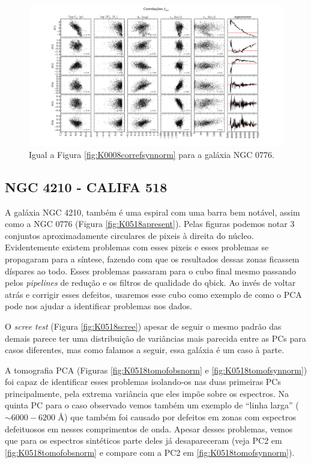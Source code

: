 \begin{figure}
    \includegraphics[width=1.2\textwidth, angle=-90]{figuras/K0073-correl-f_syn_norm-PCvsPhys.pdf}
	\caption[Correlações PCs vs. par\^ametros f\'isicos - $f_{syn}$ - NGC 0001]
	{Igual a Figura \ref{fig:K0008correfsynnorm} para a galáxia NGC 0776.}
    \label{fig:K0073correfsynnorm}
\end{figure}

\subsection{NGC 4210 - CALIFA 518}

A galáxia NGC 4210, também é uma espiral com uma barra bem notável, assim como a NGC 0776 (Figura
\ref{fig:K0518apresent}). Pelas figuras podemos notar 3 conjuntos aproximadamente circulares de pixeis à direita do
núcleo. Evidentemente existem problemas com esses pixeis e esses problemas se propagaram para a síntese, fazendo com que
os resultados dessas zonas ficassem díspares ao todo. Esses problemas passaram para o cubo final mesmo passando pelos
{\em pipelines} de redução e os filtros de qualidade do {\sc qbick}. Ao invés de voltar atrás e corrigir esses defeitos,
usaremos esse cubo como exemplo de como o PCA pode nos ajudar a identificar problemas nos dados.

O {\em scree test} (Figura \ref{fig:K0518scree}) apesar de seguir o mesmo padrão das demais parece ter uma distribuição
de variâncias mais parecida entre as PCs para casos diferentes, mas como falamos a seguir, essa galáxia é um caso à
parte.

A tomografia PCA (Figuras \ref{fig:K0518tomofobsnorm} e \ref{fig:K0518tomofsynnorm}) foi capaz de identificar esses
problemas isolando-os nas duas primeiras PCs principalmente, pela extrema variância que eles impõe sobre os espectros.
Na quinta PC para o caso observado vemos também um exemplo de ``linha larga'' ($\sim6000-6200$ \AA) que também foi
causado por defeitos em zonas com espectros defeituosos em nesses comprimentos de onda. Apesar desses problemas, vemos
que para os espectros sintéticos parte deles já desapareceram (veja PC2 em \ref{fig:K0518tomofobsnorm} e compare com a
PC2 em \ref{fig:K0518tomofsynnorm}).

